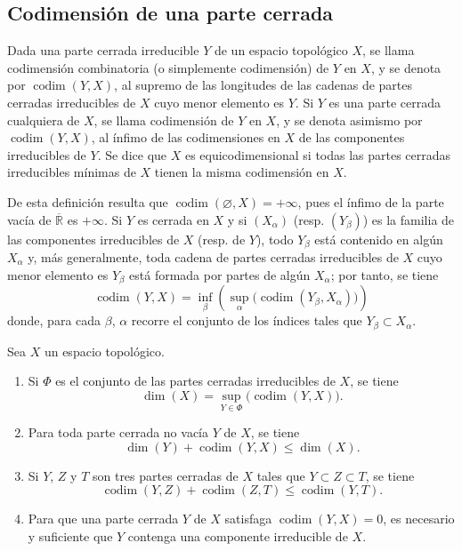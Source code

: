 \subsection{Codimensión de una parte cerrada}
\label{subsection:0.14.2-es}

\begin{definition}[14.2.1]
\label{0.14.2.1-es}
Dada una parte cerrada irreducible $Y$ de un espacio topológico $X$, se llama
codimensión combinatoria \textup{(o simplemente} codimensión) de $Y$ en
$X$, y se denota por $\operatorname{codim}(Y,X)$, al supremo de las longitudes
de las cadenas de partes cerradas irreducibles de $X$ cuyo menor elemento es
$Y$. Si $Y$ es una parte cerrada cualquiera de $X$, se llama
codimensión de $Y$ en $X$, y se denota asimismo por
$\operatorname{codim}(Y,X)$, al ínfimo de las codimensiones en $X$ de las
componentes irreducibles de $Y$. Se dice que $X$ es
equicodimensional si todas las partes cerradas irreducibles mínimas de
$X$ tienen la misma codimensión en $X$.
\end{definition}

De esta definición resulta que
$\operatorname{codim}(\varnothing,X)=+\infty$, pues el ínfimo de la parte vacía
de $\overline{\mathbb R}$ es $+\infty$. Si $Y$ es cerrada en $X$ y si
$(X_\alpha)$ (resp. $(Y_\beta)$) es la familia de las componentes irreducibles
de $X$ (resp. de $Y$), todo $Y_\beta$ está contenido en algún $X_\alpha$ y,
más generalmente, toda cadena de partes cerradas irreducibles de $X$ cuyo menor
elemento es $Y_\beta$ está formada por partes de algún $X_\alpha$; por tanto,
se tiene
\[
  \operatorname{codim}(Y,X)=
  \inf_\beta\left(\sup_\alpha
  \bigl(\operatorname{codim}(Y_\beta,X_\alpha)\bigr)\right)
  \tag{14.2.1.1}\label{0.14.2.1.1-es}
\]
donde, para cada $\beta$, $\alpha$ recorre el conjunto de los índices tales que
$Y_\beta\subset X_\alpha$.

\begin{proposition}[14.2.2]
\label{0.14.2.2-es}
Sea $X$ un espacio topológico.
\begin{enumerate}
  \item[\rm(i)] Si $\Phi$ es el conjunto de las partes cerradas irreducibles de
  $X$, se tiene
  \[
    \dim(X)=\sup_{Y\in\Phi}\bigl(\operatorname{codim}(Y,X)\bigr).
    \tag{14.2.2.1}\label{0.14.2.2.1-es}
  \]
  \item[\rm(ii)] Para toda parte cerrada no vacía $Y$ de $X$, se tiene
  \[
    \dim(Y)+\operatorname{codim}(Y,X)\leq\dim(X).
    \tag{14.2.2.2}\label{0.14.2.2.2-es}
  \]
  \item[\rm(iii)] Si $Y$, $Z$ y $T$ son tres partes cerradas de $X$ tales que
  $Y\subset Z\subset T$, se tiene
  \[
    \operatorname{codim}(Y,Z)+\operatorname{codim}(Z,T)
    \leq\operatorname{codim}(Y,T).
    \tag{14.2.2.3}\label{0.14.2.2.3-es}
  \]
  \item[\rm(iv)] Para que una parte cerrada $Y$ de $X$ satisfaga
  $\operatorname{codim}(Y,X)=0$, es necesario y suficiente que $Y$ contenga
  una componente irreducible de $X$.
\end{enumerate}
\end{proposition}

